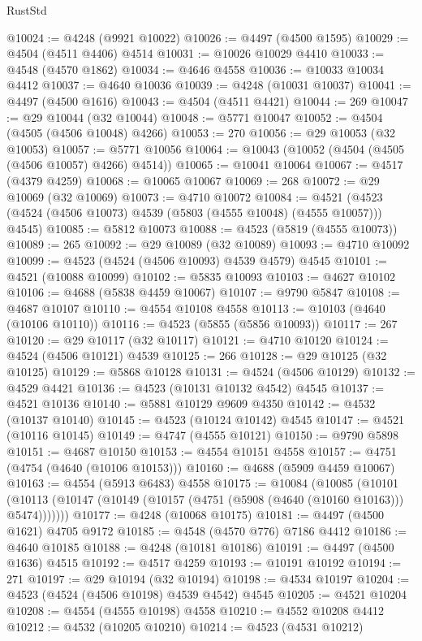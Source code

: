 \begin{lexlean}{RustStd}
\begin{coremodule}
@10024 := @4248 (@9921 @10022)
@10026 := @4497 (@4500 @1595)
@10029 := @4504 (@4511 @4406) @4514
@10031 := @10026 @10029 @4410
@10033 := @4548 (@4570 @1862)
@10034 := @4646 @4558
@10036 := @10033 @10034 @4412
@10037 := @4640 @10036
@10039 := @4248 (@10031 @10037)
@10041 := @4497 (@4500 @1616)
@10043 := @4504 (@4511 @4421)
@10044 := 269
@10047 := @29 @10044 (@32 @10044)
@10048 := @5771 @10047
@10052 := @4504 (@4505 (@4506 @10048) @4266)
@10053 := 270
@10056 := @29 @10053 (@32 @10053)
@10057 := @5771 @10056
@10064 := @10043 (@10052 (@4504 (@4505 (@4506 @10057) @4266) @4514))
@10065 := @10041 @10064
@10067 := @4517 (@4379 @4259)
@10068 := @10065 @10067
@10069 := 268
@10072 := @29 @10069 (@32 @10069)
@10073 := @4710 @10072
@10084 := @4521 (@4523 (@4524 (@4506 @10073) @4539 (@5803 (@4555 @10048) (@4555 @10057))) @4545)
@10085 := @5812 @10073
@10088 := @4523 (@5819 (@4555 @10073))
@10089 := 265
@10092 := @29 @10089 (@32 @10089)
@10093 := @4710 @10092
@10099 := @4523 (@4524 (@4506 @10093) @4539 @4579) @4545
@10101 := @4521 (@10088 @10099)
@10102 := @5835 @10093
@10103 := @4627 @10102
@10106 := @4688 (@5838 @4459 @10067)
@10107 := @9790 @5847
@10108 := @4687 @10107
@10110 := @4554 @10108 @4558
@10113 := @10103 (@4640 (@10106 @10110))
@10116 := @4523 (@5855 (@5856 @10093))
@10117 := 267
@10120 := @29 @10117 (@32 @10117)
@10121 := @4710 @10120
@10124 := @4524 (@4506 @10121) @4539
@10125 := 266
@10128 := @29 @10125 (@32 @10125)
@10129 := @5868 @10128
@10131 := @4524 (@4506 @10129)
@10132 := @4529 @4421
@10136 := @4523 (@10131 @10132 @4542) @4545
@10137 := @4521 @10136
@10140 := @5881 @10129 @9609 @4350
@10142 := @4532 (@10137 @10140)
@10145 := @4523 (@10124 @10142) @4545
@10147 := @4521 (@10116 @10145)
@10149 := @4747 (@4555 @10121)
@10150 := @9790 @5898
@10151 := @4687 @10150
@10153 := @4554 @10151 @4558
@10157 := @4751 (@4754 (@4640 (@10106 @10153)))
@10160 := @4688 (@5909 @4459 @10067)
@10163 := @4554 (@5913 @6483) @4558
@10175 := @10084
    (@10085
      (@10101 (@10113 (@10147 (@10149 (@10157 (@4751 (@5908 (@4640 (@10160 @10163))) @5474)))))))
@10177 := @4248 (@10068 @10175)
@10181 := @4497 (@4500 @1621) @4705 @9172
@10185 := @4548 (@4570 @776) @7186 @4412
@10186 := @4640 @10185
@10188 := @4248 (@10181 @10186)
@10191 := @4497 (@4500 @1636) @4515
@10192 := @4517 @4259
@10193 := @10191 @10192
@10194 := 271
@10197 := @29 @10194 (@32 @10194)
@10198 := @4534 @10197
@10204 := @4523 (@4524 (@4506 @10198) @4539 @4542) @4545
@10205 := @4521 @10204
@10208 := @4554 (@4555 @10198) @4558
@10210 := @4552 @10208 @4412
@10212 := @4532 (@10205 @10210)
@10214 := @4523 (@4531 @10212)

\end{coremodule}
\end{lexlean}
